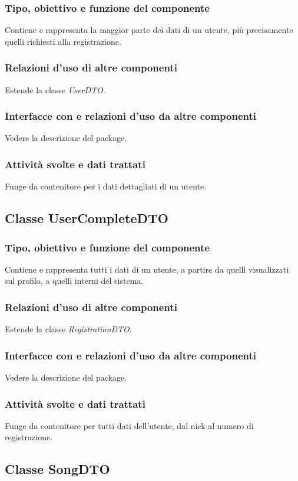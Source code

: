 \subsubsection*{Tipo, obiettivo e funzione del componente}
Contiene e rappresenta la maggior parte dei dati di un utente, pi\`u
precisamente quelli richiesti alla registrazione.
\subsubsection*{Relazioni d'uso di altre componenti}
Estende la classe \textit{UserDTO}.
\subsubsection*{Interfacce con e relazioni d'uso da altre componenti}
Vedere la descrizione del package.
\subsubsection*{Attivit\`a svolte e dati trattati}
Funge da contenitore per i dati dettagliati di un utente.

\subsection{Classe UserCompleteDTO}
\subsubsection*{Tipo, obiettivo e funzione del componente}
Contiene e rappresenta tutti i dati di un utente, a partire da quelli
visualizzati sul profilo, a quelli interni del sistema.
\subsubsection*{Relazioni d'uso di altre componenti}
Estende la classe \textit{RegistrationDTO}.
\subsubsection*{Interfacce con e relazioni d'uso da altre componenti}
Vedere la descrizione del package.
\subsubsection*{Attivit\`a svolte e dati trattati}
Funge da contenitore per tutti dati dell'utente, dal nick al numero di
registrazione.

\subsection{Classe SongDTO}
